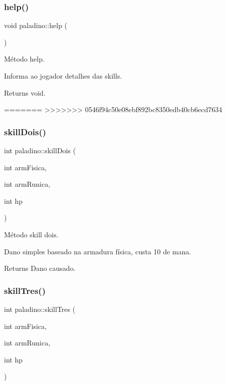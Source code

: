\subsubsection{\texorpdfstring{help()}{help()}}
{\footnotesize\ttfamily void paladino\+::help (\begin{DoxyParamCaption}{ }\end{DoxyParamCaption})}



Método help. 

Informa ao jogador detalhes das skills. \begin{DoxyReturn}{Returns}
void. 
\end{DoxyReturn}
=======
>>>>>>> 0546f94c50e08ebf892bc8350edb40cb6ecd7634
\mbox{\label{classpaladino_a62a3129268222902926377c6dd0dceb5}} 
\subsubsection{\texorpdfstring{skill\+Dois()}{skillDois()}}
{\footnotesize\ttfamily int paladino\+::skill\+Dois (\begin{DoxyParamCaption}\item[{int}]{arm\+Fisica,  }\item[{int}]{arm\+Runica,  }\item[{int}]{hp }\end{DoxyParamCaption})}



Método skill dois. 

Dano simples baseado na armadura física, custa 10 de mana. \begin{DoxyReturn}{Returns}
Dano causado. 
\end{DoxyReturn}
\mbox{\label{classpaladino_acd4e68058d2504c07989af88ace6d57b}} 
\subsubsection{\texorpdfstring{skill\+Tres()}{skillTres()}}
{\footnotesize\ttfamily int paladino\+::skill\+Tres (\begin{DoxyParamCaption}\item[{int}]{arm\+Fisica,  }\item[{int}]{arm\+Runica,  }\item[{int}]{hp }\end{DoxyParamCaption})}



